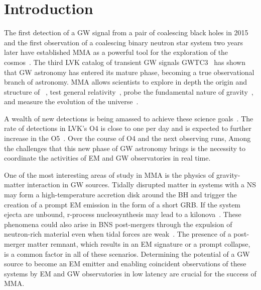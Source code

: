 \section{Introduction} \label{intro}

The first detection of a \ac{GW} signal from a pair of coalescing black holes in 2015 and the first observation of a coalescing binary neutron star system two years later have established
\ac{MMA} as a powerful tool for the exploration of the cosmos~\cite{LIGOScientific:2016aoc,LIGOScientific:2017vwq,LIGOScientific:2018cki}. The third \ac{LVK} catalog of transient \ac{GW}
signals \ac{GWTC3}~\cite{LIGOScientific:2021djp} has shown that \ac{GW} astronomy has entered its mature phase, becoming a true observational branch of astronomy. \ac{MMA} allows
scientists to explore in depth the origin and structure of  ~\cite{Schmidt:2020ekt,Nitz:2021zwj,Barack:2018yly}, test general relativity~\cite{LIGOScientific:2021sio,Berti:2018cxi,Berti:2018vdi,Isi:2019aib}, probe the fundamental nature of
gravity~\cite{LISA:2022yao,Barausse:2020rsu,Piorkowska-Kurpas:2022idw}, and measure the evolution of the universe~\cite{LIGOScientific:2021psn,LIGOScientific:2021aug}.

A wealth of new detections is being amassed to achieve these science goals~\cite{LIGOScientific:2014pky,VIRGO:2014yos}. The rate of detections in \ac{LVK}'s \ac{O4} is close to one per
day and is expected to further increase in the \ac{O5}~\cite{KAGRA:2013rdx}. Over the course of \ac{O4} and the next observing runs,  Among the challenges that this new phase of \ac{GW} astronomy brings is the necessity
to coordinate the activities of \ac{EM} and \ac{GW} observatories in real time. 

One of the most interesting areas of study in \ac{MMA} is the physics of gravity-matter interaction in \ac{GW} sources. Tidally disrupted matter in systems with a \ac{NS} may form a
high-temperature accretion disk around the \ac{BH} and trigger the creation of a prompt \ac{EM} emission in the form of a short \ac{GRB}. If the system ejecta are unbound, r-process
nucleosynthesis may lead to a kilonova~\cite{Lattimer:1974slx, Li:1998bw, Korobkin:2012uy, Barnes:2013wka, Tanaka:2013ana, Kasen:2014toa}. These phenomena could also arise in \ac{BNS}
post-mergers through the expulsion of neutron-rich material even when tidal forces are weak~\cite{LIGOScientific:2017ync, Arcavi:2017xiz, Coulter:2017wya, Kasliwal:2017ngb,
Lipunov:2017dwd, DES:2017kbs, Tanvir:2017pws}. The presence of a post-merger matter remnant, which results in an \ac{EM} signature or a prompt collapse, is a common factor in all of these
scenarios. Determining the potential of a \ac{GW} source to become an \ac{EM} emitter and enabling coincident observations of these systems by \ac{EM} and \ac{GW} observatories in low
latency are crucial for the success of \ac{MMA}.

